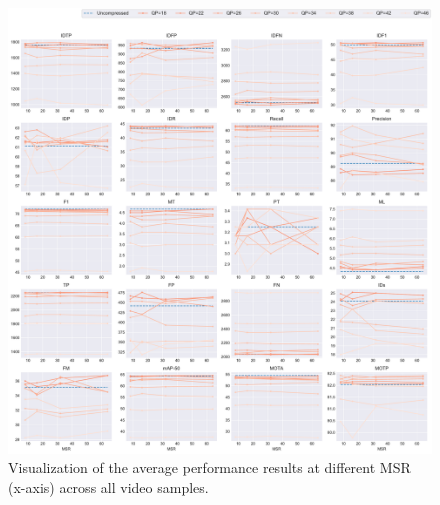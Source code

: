 \begin{figure}[!htbp]
  \centering
  \includegraphics[width=1.0\linewidth]{img/averaged_all_multiplots_msr.pdf}
  \caption[Visualization of the averaged performance results at different MSR (x-axis) of all video samples]
  {Visualization of the average performance results at different MSR (x-axis) across all video samples.}
  \label{fig:averaged_result_all_multiplots_msr}
\end{figure}